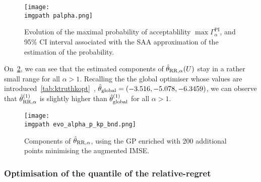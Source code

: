 \documentclass[../../Main_ManuscritThese.tex]{subfiles}
\newcommand\imgpath{/home/victor/acadwriting/Manuscrit/Text/Chapter5/img/}
\begin{document}
\begin{figure}[ht]
  \centering
  \texttt{[image: \\imgpath palpha.png]}
  \caption[Evolution of the maximal probability of
    acceptablility $\max \Gamma_{\alpha}^{\mathrm{PI}}$]{\label{fig:p_alpha} Evolution of the maximal probability of
    acceptablility $\max \Gamma_{\alpha}^{\mathrm{PI}}$, and 95\% CI
    interval associated with the SAA approximation of the estimation
    of the probability.}
\end{figure}

On~\cref{fig:evo_alphap_kp}, we can see that the estimated components
of $\hat{\theta}_{\mathrm{RR},\alpha}(U)$ stay in a rather small range
for all $\alpha >1$. Recalling the the global optimiser whose values
are introduced~\cref{tab:ktruthkopt}~,
$\hat{\theta}_{\mathrm{global}} = (-3.516, -5.078, -6.3459 )$, we can
observe that $\hat{\theta}^{(1)}_{\mathrm{RR}, \alpha}$ is slightly
higher than $\hat{\theta}^{(1)}_{\mathrm{global}}$ for all $\alpha > 1$.


\begin{figure}[ht]
  \centering
  \texttt{[image: \\imgpath evo\_alpha\_p\_kp\_bnd.png]}
  \caption[Components of $\hat{\kk}_{\mathrm{RR},\alpha}$ after
  augmented IMSE reduction]{\label{fig:evo_alphap_kp} Components of
    $\hat{\kk}_{\mathrm{RR},\alpha}$, using the GP enriched with 200
    additional points minimising the augmented IMSE.}
\end{figure}


\clearpage
\subsubsection{Optimisation of the quantile of the relative-regret}
\label{ssec:optim_quantile_rr}
\end{document}
